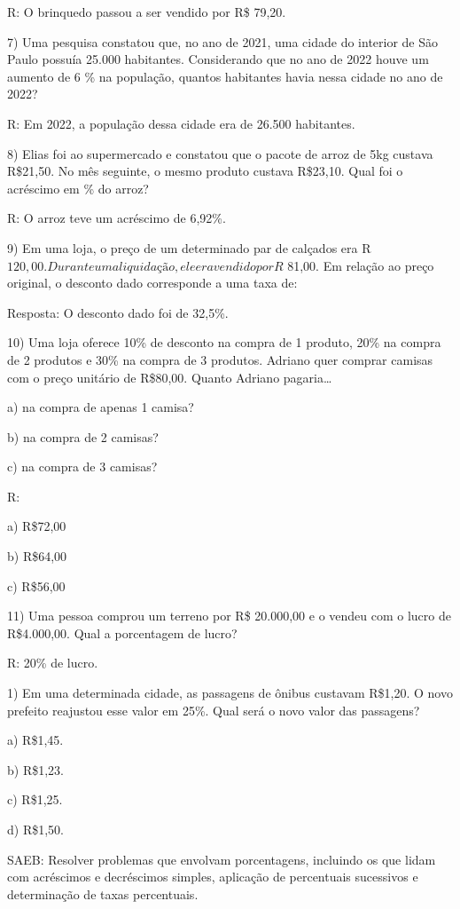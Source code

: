 R: O brinquedo passou a ser vendido por R\$ 79,20.

7) Uma pesquisa constatou que, no ano de 2021, uma cidade do interior de
São Paulo possuía 25.000 habitantes. Considerando que no ano de 2022
houve um aumento de 6 \% na população, quantos habitantes havia nessa
cidade no ano de 2022?

R: Em 2022, a população dessa cidade era de 26.500 habitantes.

8) Elias foi ao supermercado e constatou que o pacote de arroz de 5kg
custava R\$21,50. No mês seguinte, o mesmo produto custava R\$23,10.
Qual foi o acréscimo em \% do arroz?

R: O arroz teve um acréscimo de 6,92\%.

9) Em uma loja, o preço de um determinado par de calçados era
R\(120,00. Durante uma liquidação, ele era vendido por R\) 81,00. Em
relação ao preço original, o desconto dado corresponde a uma taxa de:

Resposta: O desconto dado foi de 32,5\%.

10) Uma loja oferece 10\% de desconto na compra de 1 produto, 20\% na
compra de 2 produtos e 30\% na compra de 3 produtos. Adriano quer
comprar camisas com o preço unitário de R\$80,00. Quanto Adriano
pagaria\ldots{}

a) na compra de apenas 1 camisa?

b) na compra de 2 camisas?

c) na compra de 3 camisas?

R:

a) R\$72,00

b) R\$64,00

c) R\$56,00

11) Uma pessoa comprou um terreno por R\$ 20.000,00 e o vendeu com o
lucro de R\$4.000,00. Qual a porcentagem de lucro?

R: 20\% de lucro.


1) Em uma determinada cidade, as passagens de ônibus custavam R\$1,20. O
novo prefeito reajustou esse valor em 25\%. Qual será o novo valor das
passagens?

a) R\$1,45.

b) R\$1,23.

c) R\$1,25.

d) R\$1,50.

SAEB: Resolver problemas que envolvam porcentagens, incluindo os que
lidam com acréscimos e decréscimos simples, aplicação de percentuais
sucessivos e determinação de taxas percentuais.

